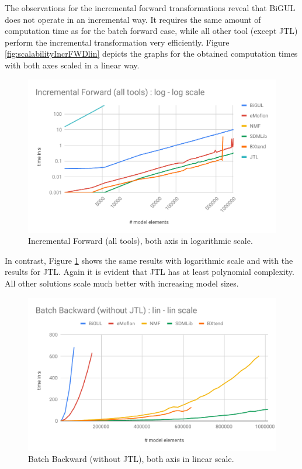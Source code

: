 The observations for the incremental forward transformations reveal that BiGUL does not operate in an incremental way. It requires the same amount of computation time as for the batch forward case, while all other tool (except JTL) perform the incremental transformation very efficiently. Figure \ref{fig:scalabilityIncrFWDlin} depicts the graphs for the obtained computation times with both axes scaled in a linear way.

\begin{figure}[h!]
	\centering
	\includegraphics[width=\columnwidth]{diagrams/scalability/IFloglog}
	\caption{Incremental Forward (all tools), both axis in logarithmic scale.}
	\label{fig:scalabilityIncrFWDlog}
\end{figure}

In contrast, Figure \ref{fig:scalabilityIncrFWDlog} shows the same results with logarithmic scale and with the results for JTL. Again it is evident that JTL has at least polynomial complexity. All other solutions scale much better with increasing model sizes. 

\begin{figure}[h!]
	\centering
	\includegraphics[width=\columnwidth]{diagrams/scalability/BBlinlin}
	\caption{Batch Backward (without JTL), both axis in linear scale.}
	\label{fig:scalabilityBatchBWDlin}
\end{figure}

